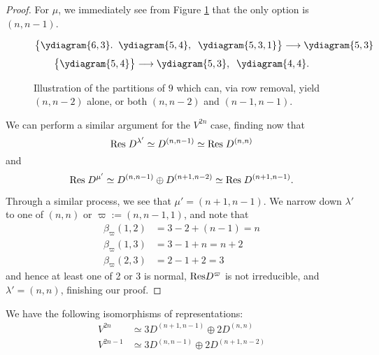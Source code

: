 \documentclass{amsart}
\begin{document}
\begin{proof}
  For $\mu$, we immediately see from Figure \ref{OddRes} that the only option is $(n,n-1)$.
  \begin{figure}
  \[
      \cbr{
        \begin{gathered}
        \ydiagram{6,3}. \; \;
        \ydiagram{5,4}, \; \;
        \ydiagram{5,3,1}
      \end{gathered} 
    }\longrightarrow \begin{gathered}
      \ydiagram{5,3}
  \end{gathered}\]
      \[\cbr{
        \begin{gathered}
          \ydiagram{5,4}
        \end{gathered}
      }\longrightarrow
      \begin{gathered}
        \ydiagram{5,3},\;\;
        \ydiagram{4,4}.
      \end{gathered}
    \]
      \caption{
      Illustration of the partitions of $9$ which can, via row removal, yield $(n,n-2)$ alone, or both $(n,n-2)$ and $(n-1,n-1)$.
    }\label{OddRes}
  \end{figure}  
  
  We can perform a similar argument for the $V^{2n}$ case, finding now that 
  \[\text{Res} \; D^{\lambda'} \simeq D^{(n,n-1)} \simeq \text{Res} \; D^{(n,n)}\] and 
  \[\text{Res} \; D^{\mu'} \simeq D^{(n,n-1)} \oplus D^{(n+1,n-2)} \simeq \text{Res} \; D^{(n+1,n-1)}.\]
  
  Through a similar process, we see that $\mu' = (n+1,n-1)$.
  We narrow down $\lambda'$ to one of $(n,n)$ or $\varpi := (n,n-1,1)$, and note that
  \begin{align*} 
    \beta_\varpi(1,2) &= 3 - 2 + (n-1) = n\\
    \beta_\varpi(1,3) &= 3 - 1 + n = n+2\\
    \beta_\varpi(2,3) &= 2 - 1 + 2 = 3
  \end{align*}
  and hence at least one of 2 or 3 is normal, $\text{Res} D^{\varpi}$ is not irreducible, and $\lambda' = (n,n)$, finishing our proof.
\end{proof}
\begin{corollary}
  We have the following isomorphisms of representations:
  \begin{align*} 
    V^{2n} &\simeq 3D^{(n+1,n-1)} \oplus 2D^{(n,n)}\\
    V^{2n - 1} &\simeq 3D^{(n,n-1)} \oplus 2D^{(n+1,n-2)}
  \end{align*}
\end{corollary}
\end{document}
